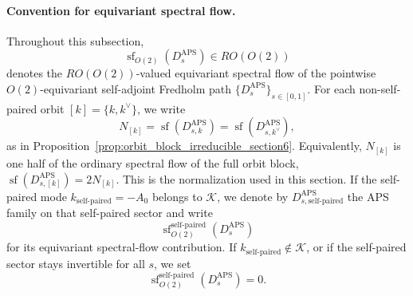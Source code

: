 \documentclass[11pt]{article}
\theoremstyle{definition}
\DeclareMathOperator{\APS}{APS}
\numberwithin{equation}{section}
\begin{document}
\paragraph{Convention for equivariant spectral flow.}
Throughout this subsection, 
\begin{equation}
\operatorname{sf}_{O(2)}(D_s^{\APS}) \in RO(O(2))
\end{equation}
denotes the $RO(O(2))$-valued equivariant spectral flow of the pointwise $O(2)$-equivariant
self-adjoint Fredholm path $\{D_s^{\APS}\}_{s\in[0,1]}$.
For each non-self-paired orbit $[k]=\{k,k^\vee\}$, we write
\begin{equation}
N_{[k]}
= \operatorname{sf}(D_{s,k}^{\APS})
= \operatorname{sf}(D_{s,k^\vee}^{\APS}),
\end{equation}
as in Proposition~\ref{prop:orbit_block_irreducible_section6}.
Equivalently, $N_{[k]}$ is one half of the ordinary spectral flow of the full orbit block, \(\operatorname{sf}(D_{s,[k]}^{\APS}) = 2N_{[k]}\).
This is the normalization used in this section. If the self-paired mode \(k_{\text{self-paired}}=-A_0\) belongs to \(\mathcal K\), we denote by \(D_{s,\text{self-paired}}^{\APS}\)
the APS family on that self-paired sector and write
\begin{equation}\label{eq:wall_equivariant_sf_section6}
\operatorname{sf}_{O(2)}^{\text{self-paired}}(D_s^{\APS})
\end{equation}
for its equivariant spectral-flow contribution. If \(k_{\text{self-paired}}\notin\mathcal K\), or if the self-paired sector stays invertible for all \(s\), we set
\begin{equation}\label{eq:wall_term_zero_section6}
\operatorname{sf}_{O(2)}^{\text{self-paired}}(D_s^{\APS})=0.
\end{equation}
\end{document}
